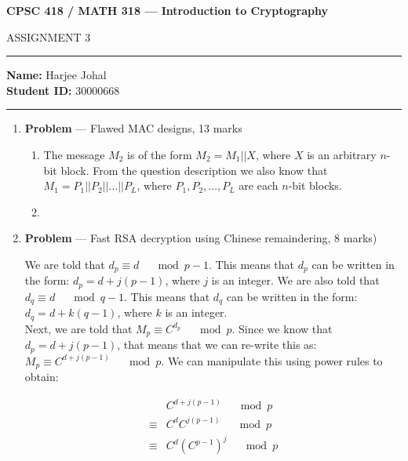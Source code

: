 \documentclass[11pt]{article}
\theoremstyle{definition}
\newcounter{problem}
\begin{document}
\begin{center}
{\bf \Large CPSC 418 / MATH 318 --- Introduction to Cryptography

ASSIGNMENT 3 }
\end{center}

\hrule 	

\textbf{Name:} Harjee Johal \\
\textbf{Student ID:} 30000668

\medskip \hrule

\begin{enumerate} \itemsep 20pt

\item[] \textbf{Problem \theproblem} --- Flawed MAC designs, 13 marks

\begin{enumerate}

\item The message $M_2$ is of the form $M_2 = M_1 || X$, where $X$ is an arbitrary $n$-bit block. From
the question description we also know that $M_1 = P_1 || P_2 || \ldots || P_L$, where $P_1, P_2, \ldots, P_L$ are
each $n$-bit blocks. 

\item %
\end{enumerate}

\newpage

\item[] \textbf{Problem \theproblem} --- Fast RSA decryption using Chinese remaindering, 8
    marks)

We are told that $d_p \equiv d \quad \mod{p - 1}$. This means that $d_p$ can be written in the form: $d_p = d + j(p-1)$, where $j$ is an integer. We are also told that $d_q \equiv d \quad \mod{q - 1}$. This means that $d_q$ can be written in the form: $d_q = d + k(q-1)$, where $k$ is an integer. \\ 

Next, we are told that $M_p \equiv C^{d_p} \quad \mod{p}$. Since we know that $d_p = d + j(p-1)$, that means that we can re-write this as: $M_p \equiv C^{d + j(p-1)} \quad \mod{p}$. We can manipulate this using power rules to obtain:

\begin{align*}
    &C^{d + j(p-1)} \quad \mod{p} \\
    \equiv &C^d C^{j(p-1)} \quad \mod{p} \\
    \equiv &C^d (C^{p-1})^j \quad \mod{p}
\end{align*}


\end{enumerate}
\end{document}
